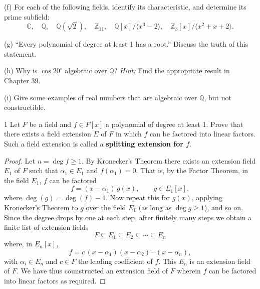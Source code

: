 \begin{problem}[Warmup]{(f)}
    For each of the following fields, identify its characteristic, and determine its prime subfield: \[\mathbb{C}, \quad \mathbb{Q}, \quad \mathbb{Q}(\sqrt{2}), \quad \mathbb{Z}_{11}, \quad \mathbb{Q}[x]/\langle x^3 - 2 \rangle, \quad \mathbb{Z}_3[x]/\langle x^2 + x + 2 \rangle.\]
\end{problem}
\unsolved

\begin{problem}[Warmup]{(g)}
    ``Every polynomial of degree at least 1 has a root.'' Discuss the truth of this statement.
\end{problem}
\unsolved

\begin{problem}[Warmup]{(h)}
    Why is $\cos 20^\circ$ algebraic over $\mathbb{Q}$? \emph{Hint:} Find the appropriate result in Chapter 39.
\end{problem}
\unsolved

\begin{problem}[Warmup]{(i)}
    Give some examples of real numbers that are algebraic over $\mathbb{Q}$, but not constructible.
\end{problem}
\unsolved

\begin{problem}{1}
    Let $F$ be a field and $f \in F[x]$ a polynomial of degree at least 1.
    Prove that there exists a field extension $E$ of $F$ in which $f$ can be
    factored into linear factors. Such a field extension is called a
    \textbf{splitting extension for $f$}.
\end{problem}
\solved

\begin{proof}
    Let $n = \deg f \geq 1$.
    By Kronecker's
    Theorem there exists an extension field $E_1$ of $F$ such that
    $\alpha_1 \in E_1$ and $f(\alpha_1) = 0$. That is, by the Factor Theorem,
    in the field $E_1$, $f$ can be factored
    \[
        f = (x - \alpha_1)\, g(x), \qquad g \in E_1[x],
    \]
    where $\deg(g) = \deg(f) - 1$. Now repeat this for $g(x)$, applying
    Kronecker's Theorem to $g$ over the field $E_1$ (as long as
    $\deg g \geq 1$), and so on. Since the degree drops by one at each step,
    after finitely many steps we obtain a finite list of extension fields
    \[
        F \subseteq E_1 \subseteq E_2 \subseteq \cdots \subseteq E_n
    \]
    where, in $E_n[x]$,
    \[
        f = c\,(x - \alpha_1)(x - \alpha_2)\cdots(x - \alpha_n),
    \]
    with $\alpha_i \in E_n$ and $c \in F$ the leading coefficient of $f$.
    This $E_n$ is an extension field of $F$. 
    We have thus counstructed an extension field of $F$ wherein $f$ can be 
        factored into linear factors as required.
\end{proof}


